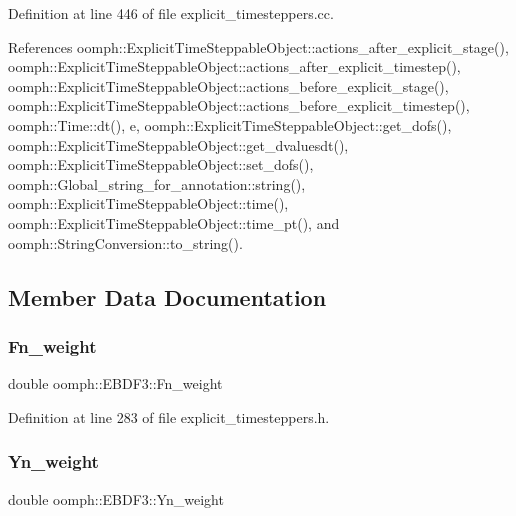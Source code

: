 Definition at line 446 of file explicit\+\_\+timesteppers.\+cc.



References oomph\+::\+Explicit\+Time\+Steppable\+Object\+::actions\+\_\+after\+\_\+explicit\+\_\+stage(), oomph\+::\+Explicit\+Time\+Steppable\+Object\+::actions\+\_\+after\+\_\+explicit\+\_\+timestep(), oomph\+::\+Explicit\+Time\+Steppable\+Object\+::actions\+\_\+before\+\_\+explicit\+\_\+stage(), oomph\+::\+Explicit\+Time\+Steppable\+Object\+::actions\+\_\+before\+\_\+explicit\+\_\+timestep(), oomph\+::\+Time\+::dt(), e, oomph\+::\+Explicit\+Time\+Steppable\+Object\+::get\+\_\+dofs(), oomph\+::\+Explicit\+Time\+Steppable\+Object\+::get\+\_\+dvaluesdt(), oomph\+::\+Explicit\+Time\+Steppable\+Object\+::set\+\_\+dofs(), oomph\+::\+Global\+\_\+string\+\_\+for\+\_\+annotation\+::string(), oomph\+::\+Explicit\+Time\+Steppable\+Object\+::time(), oomph\+::\+Explicit\+Time\+Steppable\+Object\+::time\+\_\+pt(), and oomph\+::\+String\+Conversion\+::to\+\_\+string().



\subsection{Member Data Documentation}
\mbox{\label{classoomph_1_1EBDF3_ad79bff41bb685114506252f24dd3e17e}} 
\subsubsection{\texorpdfstring{Fn\+\_\+weight}{Fn\_weight}}
{\footnotesize\ttfamily double oomph\+::\+E\+B\+D\+F3\+::\+Fn\+\_\+weight\hspace{0.3cm}{\ttfamily [private]}}



Definition at line 283 of file explicit\+\_\+timesteppers.\+h.

\mbox{\label{classoomph_1_1EBDF3_a150ab6a608fee6e927c537b44daddefa}} 
\subsubsection{\texorpdfstring{Yn\+\_\+weight}{Yn\_weight}}
{\footnotesize\ttfamily double oomph\+::\+E\+B\+D\+F3\+::\+Yn\+\_\+weight\hspace{0.3cm}{\ttfamily [private]}}



